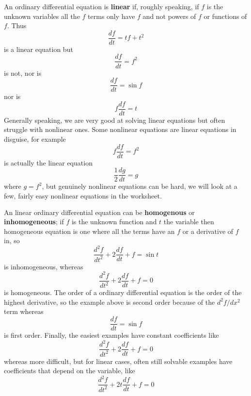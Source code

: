 \documentclass[12pt]{article}
\begin{document}
An ordinary differential equation is \textbf{linear} if, roughly
speaking, if $f$ is the unknown variables all the $f$ terms only have
$f$ and not powers of $f$ or functions of $f$. Thus
\begin{equation}
  \frac{df}{dt}=tf+t^2
\end{equation}
is a linear equation but
\begin{equation}
  \frac{df}{dt}=f^2
\end{equation}
is not, nor is
\begin{equation}
  \frac{df}{dt}=\sin{f}
\end{equation}
nor is
\begin{equation}
  f\frac{df}{dt}=t
\end{equation}
Generally speaking, we are very good at solving linear equations but often struggle with nonlinear ones. Some nonlinear equations are linear equations in disguise, for example
\begin{equation}
  f\frac{df}{dt}=f^2
\end{equation}
is actually the linear equation
\begin{equation}
  \frac{1}{2}\frac{dg}{dt}=g
\end{equation}
where $g=f^2$, but genuinely nonlinear equations can be hard, we will look at a few, fairly easy nonlinear equations in the worksheet.

An linear ordinary differential equation can be \textbf{homogenous} or
\textbf{inhomogeneous}; if $f$ is the unknown function and $t$ the
variable then homogeneous equation is one where all the terms have an
$f$ or a derivative of $f$ in, so
\begin{equation}
  \frac{d^2f}{dt^2}+2\frac{df}{dt}+f=\sin{t}
\end{equation}
is inhomogeneous, whereas 
\begin{equation}
  \frac{d^2f}{dt^2}+2\frac{df}{dt}+f=0
\end{equation}
is homogeneous. The order of a ordinary differential equation is the order of the highest derivative, so the example above is second order because of the $d^2f/dx^2$ term whereas
\begin{equation}
  \frac{df}{dt}=\sin{f}
\end{equation}
is first order. Finally, the easiest examples have constant coefficients like
\begin{equation}
  \frac{d^2f}{dt^2}+2\frac{df}{dt}+f=0
\end{equation}
whereas more difficult, but for linear cases, often still solvable examples have coefficients that depend on the variable, like
\begin{equation}
  \frac{d^2f}{dt^2}+2t\frac{df}{dt}+f=0
\end{equation}
\end{document}
